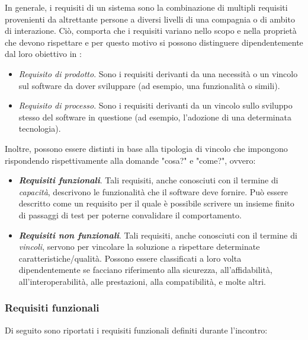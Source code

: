 In generale, i requisiti di un sistema sono la combinazione di multipli requisiti provenienti da altrettante persone a diversi livelli di una compagnia o di ambito di interazione. Ciò, comporta che i requisiti variano nello scopo e nella proprietà che devono rispettare e per questo motivo si possono distinguere dipendentemente dal loro obiettivo in \cite{requirements_types}:

\begin{itemize}
    \item \textit{Requisito di prodotto}. Sono i requisiti derivanti da una necessità o un vincolo sul software da dover sviluppare (ad esempio, una funzionalità o simili).
    \item \textit{Requisito di processo}. Sono i requisiti derivanti da un vincolo sullo sviluppo stesso del software in questione (ad esempio, l'adozione di una determinata tecnologia).
\end{itemize}

Inoltre, possono essere distinti in base alla tipologia di vincolo che impongono rispondendo rispettivamente alla domande "cosa?" e "come?", ovvero:

\begin{itemize}
    \item \textit{\textbf{Requisiti funzionali}}. Tali requisiti, anche conosciuti con il termine di \textit{capacità}, descrivono le funzionalità che il software deve fornire. Può essere descritto come un requisito per il quale è possibile scrivere un insieme finito di passaggi di test per poterne convalidare il comportamento.
    \item \textit{\textbf{Requisiti non funzionali}}. Tali requisiti, anche conosciuti con il termine di \textit{vincoli}, servono per vincolare la soluzione a rispettare determinate caratteristiche/qualità. Possono essere classificati a loro volta dipendentemente se facciano riferimento alla sicurezza, all'affidabilità, all'interoperabilità, alle prestazioni, alla compatibilità, e molte altri.
\end{itemize}

\subsubsection{Requisiti funzionali}

Di seguito sono riportati i requisiti funzionali definiti durante l'incontro:


